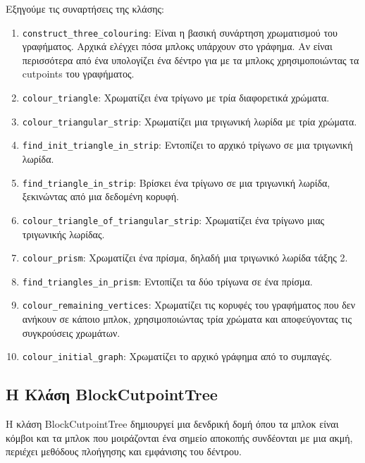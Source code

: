 Εξηγούμε τις συναρτήσεις της κλάσης:


\begin{enumerate}
	\item \texttt{construct\_three\_colouring}: Είναι η βασική συνάρτηση χρωματισμού του γραφήματος. Αρχικά ελέγχει πόσα μπλοκς υπάρχουν στο γράφημα. Αν είναι περισσότερα από ένα υπολογίζει ένα δέντρο για με τα μπλοκς χρησιμοποιώντας τα cutpoints του γραφήματος.
	
	\item \texttt{colour\_triangle}: Χρωματίζει ένα τρίγωνο με τρία διαφορετικά χρώματα.
	
	\item \texttt{colour\_triangular\_strip}: Χρωματίζει μια τριγωνική λωρίδα με τρία χρώματα.
	
	\item \texttt{find\_init\_triangle\_in\_strip}: Εντοπίζει το αρχικό τρίγωνο σε μια τριγωνική λωρίδα.
	
	\item \texttt{find\_triangle\_in\_strip}: Βρίσκει ένα τρίγωνο σε μια τριγωνική λωρίδα, ξεκινώντας από μια δεδομένη κορυφή.
	
	\item \texttt{colour\_triangle\_of\_triangular\_strip}: Χρωματίζει ένα τρίγωνο μιας τριγωνικής λωρίδας.
	
	\item \texttt{colour\_prism}: Χρωματίζει ένα πρίσμα, δηλαδή μια τριγωνικό λωρίδα τάξης 2.
	
	\item \texttt{find\_triangles\_in\_prism}: Εντοπίζει τα δύο τρίγωνα σε ένα πρίσμα.
	
	\item \texttt{colour\_remaining\_vertices}: Χρωματίζει τις κορυφές του γραφήματος που δεν ανήκουν σε κάποιο μπλοκ, χρησιμοποιώντας τρία χρώματα και αποφεύγοντας τις συγκρούσεις χρωμάτων.
	
	\item \texttt{colour\_initial\_graph}: Χρωματίζει το αρχικό γράφημα από το συμπαγές. 
		
\end{enumerate}

\subsection{H Kλάση BlockCutpointTree}
Η κλάση BlockCutpointTree δημιουργεί μια δενδρική δομή όπου τα μπλοκ είναι κόμβοι και τα μπλοκ που μοιράζονται ένα σημείο αποκοπής συνδέονται με μια ακμή, περιέχει μεθόδους πλοήγησης και εμφάνισης του δέντρου.



